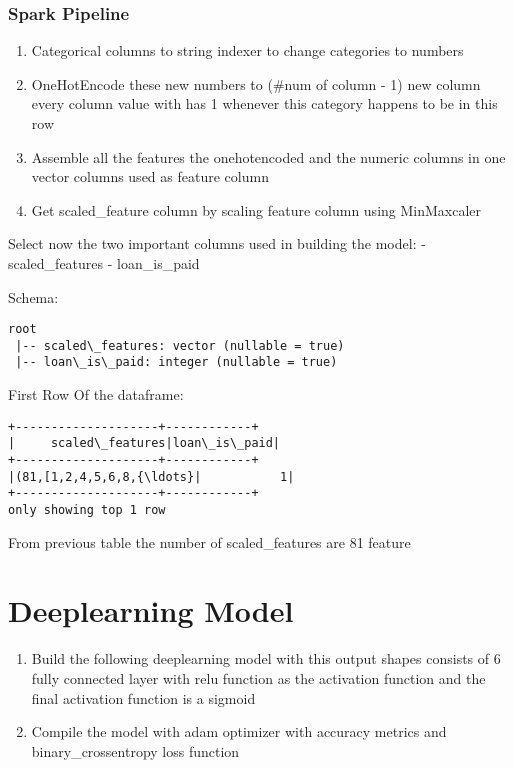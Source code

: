 \documentclass[11pt]{article}
\providecommand{\tightlist}{%
      \setlength{\itemsep}{0pt}\setlength{\parskip}{0pt}}
\begin{document}
    \hypertarget{spark-pipeline}{%
\subsubsection{Spark Pipeline}\label{spark-pipeline}}

\begin{enumerate}
\def\labelenumi{\arabic{enumi}.}
\tightlist
\item
  Categorical columns to string indexer to change categories to numbers
\item
  OneHotEncode these new numbers to (\#num of column - 1) new column
  every column value with has 1 whenever this category happens to be in
  this row
\item
  Assemble all the features the onehotencoded and the numeric columns in
  one vector columns used as feature column
\item
  Get scaled\_feature column by scaling feature column using MinMaxcaler
\end{enumerate}

    Select now the two important columns used in building the model: -
scaled\_features - loan\_is\_paid

    Schema:

    \begin{Verbatim}[commandchars=\\\{\}]
root
 |-- scaled\_features: vector (nullable = true)
 |-- loan\_is\_paid: integer (nullable = true)

    \end{Verbatim}

    First Row Of the dataframe:

    \begin{Verbatim}[commandchars=\\\{\}]
+--------------------+------------+
|     scaled\_features|loan\_is\_paid|
+--------------------+------------+
|(81,[1,2,4,5,6,8,{\ldots}|           1|
+--------------------+------------+
only showing top 1 row

    \end{Verbatim}

    From previous table the number of scaled\_features are 81 feature

    \section{Deeplearning Model}

    \begin{enumerate}
\def\labelenumi{\arabic{enumi}.}
\tightlist
\item
  Build the following deeplearning model with this output shapes
  consists of 6 fully connected layer with relu function as the
  activation function and the final activation function is a sigmoid
\item
  Compile the model with adam optimizer with accuracy metrics and
  binary\_crossentropy loss function
\end{enumerate}
\end{document}

